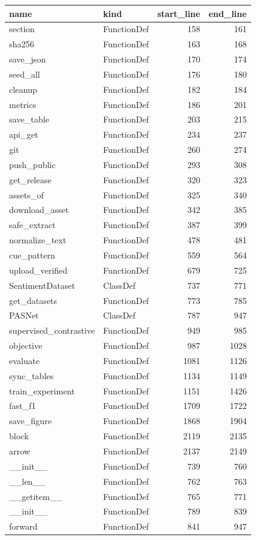 \begin{tabular}{llrr}
\toprule
name & kind & start\_line & end\_line \\
\midrule
section & FunctionDef & 158 & 161 \\
sha256 & FunctionDef & 163 & 168 \\
save\_json & FunctionDef & 170 & 174 \\
seed\_all & FunctionDef & 176 & 180 \\
cleanup & FunctionDef & 182 & 184 \\
metrics & FunctionDef & 186 & 201 \\
save\_table & FunctionDef & 203 & 215 \\
api\_get & FunctionDef & 234 & 237 \\
git & FunctionDef & 260 & 274 \\
push\_public & FunctionDef & 293 & 308 \\
get\_release & FunctionDef & 320 & 323 \\
assets\_of & FunctionDef & 325 & 340 \\
download\_asset & FunctionDef & 342 & 385 \\
safe\_extract & FunctionDef & 387 & 399 \\
normalize\_text & FunctionDef & 478 & 481 \\
cue\_pattern & FunctionDef & 559 & 564 \\
upload\_verified & FunctionDef & 679 & 725 \\
SentimentDataset & ClassDef & 737 & 771 \\
get\_datasets & FunctionDef & 773 & 785 \\
PASNet & ClassDef & 787 & 947 \\
supervised\_contrastive & FunctionDef & 949 & 985 \\
objective & FunctionDef & 987 & 1028 \\
evaluate & FunctionDef & 1081 & 1126 \\
sync\_tables & FunctionDef & 1134 & 1149 \\
train\_experiment & FunctionDef & 1151 & 1426 \\
fast\_f1 & FunctionDef & 1709 & 1722 \\
save\_figure & FunctionDef & 1868 & 1904 \\
block & FunctionDef & 2119 & 2135 \\
arrow & FunctionDef & 2137 & 2149 \\
\_\_init\_\_ & FunctionDef & 739 & 760 \\
\_\_len\_\_ & FunctionDef & 762 & 763 \\
\_\_getitem\_\_ & FunctionDef & 765 & 771 \\
\_\_init\_\_ & FunctionDef & 789 & 839 \\
forward & FunctionDef & 841 & 947 \\
\bottomrule
\end{tabular}
